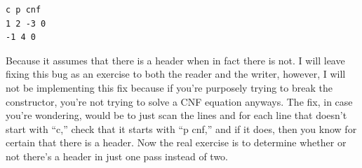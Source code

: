 \begin{lstlisting}
c p cnf
1 2 -3 0
-1 4 0
\end{lstlisting}

Because it assumes that there is a header when in fact there is not. I will
leave fixing this bug as an exercise to both the reader and the writer, however,
I will not be implementing this fix because if you're purposely trying to break
the constructor, you're not trying to solve a CNF equation anyways. The fix,
in case you're wondering, would be to just scan the lines and for each line that
doesn't start with ``c,'' check that it starts with ``p cnf,'' and if it does, then you
know for certain that there is a header. Now the real exercise is to determine
whether or not there's a header in just one pass instead of two.